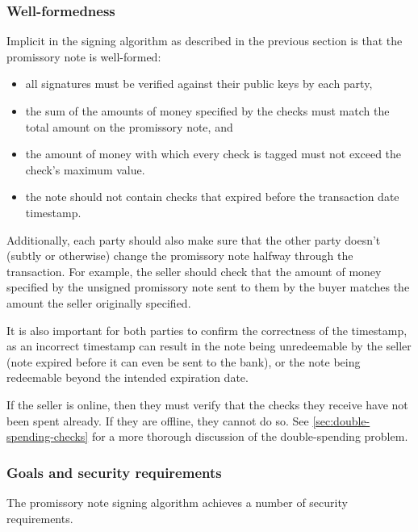 \documentclass[12pt,a4paper]{article}
\begin{document}
    \newpage
	\begin{multicols}{2}
	
	\subsubsection{Well-formedness}

	Implicit in the signing algorithm as described in the previous section is that the promissory note is well-formed:
	
	\begin{itemize}
		\item all signatures must be verified against their public keys by each party,
		\item the sum of the amounts of money specified by the checks must match the total amount on the promissory note, and
		\item the amount of money with which every check is tagged must not exceed the check's maximum value.
		\item the note should not contain checks that expired before the transaction date timestamp.
	\end{itemize}

	Additionally, each party should also make sure that the other party doesn't (subtly or otherwise) change the promissory note halfway through the transaction. For example, the seller should check that the amount of money specified by the unsigned promissory note sent to them by the buyer matches the amount the seller originally specified.
	
	It is also important for both parties to confirm the correctness of the timestamp, as an incorrect timestamp can result in the note being unredeemable by the seller (note expired before it can even be sent to the bank), or the note being redeemable beyond the intended expiration date.
	
	If the seller is online, then they must verify that the checks they receive have not been spent already. If they are offline, they cannot do so. See \autoref{sec:double-spending-checks} for a more thorough discussion of the double-spending problem.

	\subsubsection{Goals and security requirements}

	The promissory note signing algorithm achieves a number of security requirements.
	

\end{multicols}
\end{document}

